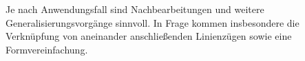 \documentclass[../main/thesis.tex]{subfiles}
\begin{document}
Je nach Anwendungsfall sind Nachbearbeitungen und weitere Generalisierungsvorgänge sinnvoll.
In Frage kommen insbesondere die Verknüpfung von aneinander anschließenden Linienzügen sowie eine Formvereinfachung.



\end{document}
